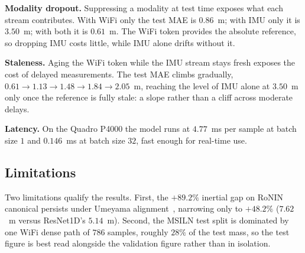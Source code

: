 \textbf{Modality dropout.} Suppressing a modality at test time exposes what each
stream contributes. With WiFi only the test MAE is $0.86$~m; with IMU only it is
$3.50$~m; with both it is $0.61$~m. The WiFi token provides the absolute
reference, so dropping IMU costs little, while IMU alone drifts without it.

\textbf{Staleness.} Aging the WiFi token while the IMU stream stays fresh exposes
the cost of delayed measurements. The test MAE climbs gradually,
$0.61 \to 1.13 \to 1.48 \to 1.84 \to 2.05$~m, reaching the level of IMU alone at
$3.50$~m only once the reference is fully stale: a slope rather than a cliff across
moderate delays.

\textbf{Latency.} On the Quadro P4000 the model runs at $4.77$~ms per sample at
batch size $1$ and $0.146$~ms at batch size $32$, fast enough for real-time use.

\subsection{Limitations}

\noindent
Two limitations qualify the results. First, the $+89.2\%$ inertial gap on RoNIN
canonical persists under Umeyama alignment~\cite{umeyama1991}, narrowing only to
$+48.2\%$ ($7.62$~m versus ResNet1D's $5.14$~m).
Second, the MSILN test split is dominated by one WiFi dense path of $786$ samples,
roughly $28\%$ of the test mass, so the test figure is best read alongside the
validation figure rather than in isolation.
